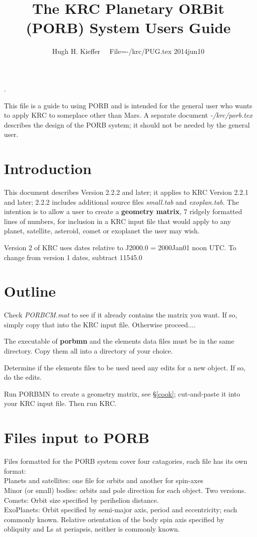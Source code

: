 \documentclass[draft]{article}  %
\title{The KRC Planetary ORBit (PORB) System Users Guide}
\author{Hugh H. Kieffer  \ \ File=-/krc/PUG.tex 2014jun10}
\newcommand{\np}{\textbf}  %
\newcommand{\nf}{\textit}  %
\newcommand{\qi}{\\ \hspace*{2.em}}      %
\begin{document}
\maketitle
\tableofcontents
\hrulefill .\hrulefill

This file is a guide to using PORB and is intended for the general user who
wants to apply KRC to someplace other than Mars.  A separate document
\nf{-/krc/porb.tex} describes the design of the PORB system; it should not be
needed by the general user.

\section{Introduction} 
This document describes Version 2.2.2 and later; it applies to KRC Version 2.2.1
and later; 2.2.2 includes additional source files \nf{small.tab} and
\nf{exoplan.tab}. The intention is to allow a user to create a \textbf{geometry
  matrix}, 7 ridgely formatted lines of numbers, for inclusion in a KRC input
file that would apply to any planet, satellite, asteroid, comet or exoplanet the
user may wish.

Version 2 of KRC uses dates relative to J2000.0 = 2000Jan01 noon UTC. To change
from version 1 dates, subtract 11545.0

\section{Outline}

Check \nf{PORBCM.mat} to see if it already contains the matrix you want. If so, simply copy that into the KRC input file. Otherwise proceed....

The executable of \np{porbmn} and the elements data files must be in the same directory. Copy them all into a directory of your choice.

Determine if the elements files to be used need any edits for a new object.
 If so, do the edits.

Run PORBMN to create a geometry matrix, see \S \ref{cook}; cut-and-paste it into your KRC input
file. Then run KRC.

\section{Files input to PORB} %
Files formatted for the PORB system cover four catagories, each file has its own format:
\qi Planets and satellites:  one file for orbits and another for spin-axes
\qi Minor (or small) bodies: orbits and pole direction for each object. Two versions.
\qi Comets: Orbit size specified by perihelion distance.  
\qi ExoPlanets: Orbit specified by semi-major axis, period and eccentricity; each commonly known. Relative orientation of the body spin axis specified by obliquity and Ls at periapsis, neither is commonly known.
\end{document}
